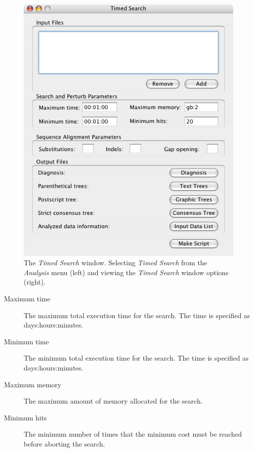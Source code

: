 {\begin{figure}
\begin{minipage}[c]{0.52\textwidth}
	   	\includegraphics[width=\textwidth]{doc/figures/timedsearch_window.jpg}
   	\end{minipage}
	
\caption{The \emph{Timed Search} window. Selecting \emph{Timed Search} from the \emph{Analysis} menu (left) and viewing the \emph{Timed Search} window options (right).}
\label{fig:timed_search}
\end{figure}

\begin{description}
    \item[Maximum time] The maximum total execution time for the search. The time is specified as
        days:hours:minutes.
    \item[Minimum time] The minimum total execution time for the search. The time is specified as
        days:hours:minutes.
    \item[Maximum memory] The maximum amount of memory allocated for the search.
    \item[Minimum hits] The minimum number of times that the minimum cost must be reached before aborting the search.
\end{description}

}
